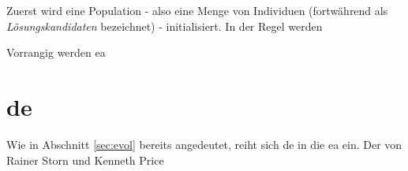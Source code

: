 	Zuerst wird eine Population - also eine Menge von Individuen (fortwährend als \textit{Lösungskandidaten} bezeichnet) - initialisiert. In der Regel werden 
	
	
	Vorrangig werden \gls{ea}


	\section{\gls{de}}
	\label{sec:de}

		Wie in Abschnitt \ref{sec:evol} bereits angedeutet, reiht sich \gls{de} in die \gls{ea} ein. Der von Rainer Storn und Kenneth Price \cite{storn-price-de} 